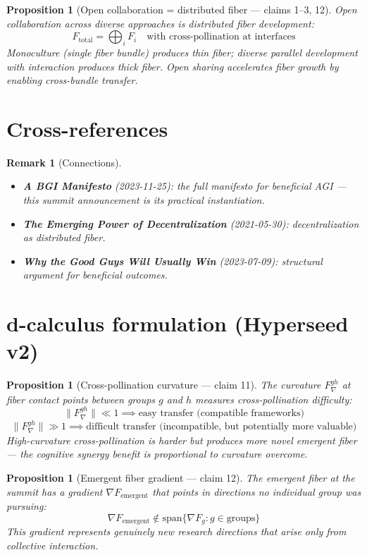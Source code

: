 \documentclass[11pt,a4paper]{article}
\newtheorem{proposition}[definition]{Proposition}
\newtheorem{remark}[definition]{Remark}
\begin{document}
\begin{proposition}[Open collaboration = distributed fiber --- claims 1--3, 12]
Open collaboration across diverse approaches is distributed fiber development:
\[
  F_{\text{total}} = \bigoplus_{i} F_i \quad \text{with cross-pollination at interfaces}
\]
Monoculture (single fiber bundle) produces thin fiber; diverse parallel
development with interaction produces thick fiber. Open sharing accelerates
fiber growth by enabling cross-bundle transfer.
\end{proposition}

\section{Cross-references}

\begin{remark}[Connections]
\begin{itemize}
\item \textbf{A BGI Manifesto} (2023-11-25): the full manifesto for
  beneficial AGI --- this summit announcement is its practical instantiation.
\item \textbf{The Emerging Power of Decentralization} (2021-05-30):
  decentralization as distributed fiber.
\item \textbf{Why the Good Guys Will Usually Win} (2023-07-09): structural
  argument for beneficial outcomes.
\end{itemize}
\end{remark}

\section{d-calculus formulation (Hyperseed v2)}

\begin{proposition}[Cross-pollination curvature --- claim 11]
\label{prop:curvature}
The curvature $F_\nabla^{gh}$ at fiber contact points between groups
$g$ and $h$ measures cross-pollination difficulty:
\[
  \|F_\nabla^{gh}\| \ll 1 \implies \text{easy transfer (compatible frameworks)}
\]
\[
  \|F_\nabla^{gh}\| \gg 1 \implies \text{difficult transfer (incompatible,
    but potentially more valuable)}
\]
High-curvature cross-pollination is harder but produces more novel
emergent fiber --- the cognitive synergy benefit is proportional to
curvature overcome.
\end{proposition}

\begin{proposition}[Emergent fiber gradient --- claim 12]
\label{prop:gradient}
The emergent fiber at the summit has a gradient $\nabla F_{\text{emergent}}$
that points in directions no individual group was pursuing:
\[
  \nabla F_{\text{emergent}} \notin \text{span}\{\nabla F_g : g \in \text{groups}\}
\]
This gradient represents genuinely new research directions that arise
only from collective interaction.
\end{proposition}
\end{document}
